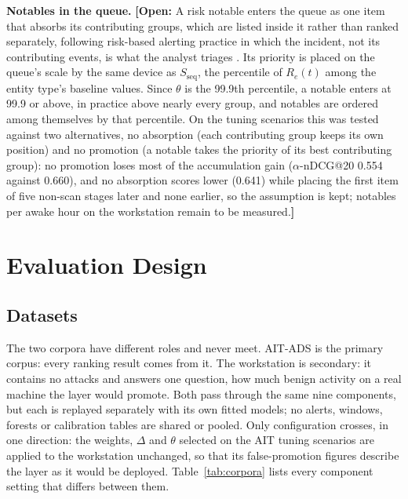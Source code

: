 \documentclass[conference]{IEEEtran}
\newcommand{\open}[1]{\textcolor{blue!70!black}{\textbf{[Open:} #1\textbf{]}}}
\begin{document}
\textbf{Notables in the queue.} \open{A risk notable enters the queue as one item that absorbs its contributing groups, which are listed inside it rather than ranked separately, following risk-based alerting practice in which the incident, not its contributing events, is what the analyst triages \cite{ref19}. Its priority is placed on the queue's scale by the same device as $S_\mathrm{seq}$, the percentile of $R_e(t)$ among the entity type's baseline values. Since $\theta$ is the 99.9th percentile, a notable enters at 99.9 or above, in practice above nearly every group, and notables are ordered among themselves by that percentile. On the tuning scenarios this was tested against two alternatives, no absorption (each contributing group keeps its own position) and no promotion (a notable takes the priority of its best contributing group): no promotion loses most of the accumulation gain ($\alpha$-nDCG@20 0.554 against 0.660), and no absorption scores lower (0.641) while placing the first item of five non-scan stages later and none earlier, so the assumption is kept; notables per awake hour on the workstation remain to be measured.}

\section{Evaluation Design}
\label{sec:eval}

\subsection{Datasets}

The two corpora have different roles and never meet. AIT-ADS is the primary corpus: every ranking result comes from it. The workstation is secondary: it contains no attacks and answers one question, how much benign activity on a real machine the layer would promote. Both pass through the same nine components, but each is replayed separately with its own fitted models; no alerts, windows, forests or calibration tables are shared or pooled. Only configuration crosses, in one direction: the weights, $\Delta$ and $\theta$ selected on the AIT tuning scenarios are applied to the workstation unchanged, so that its false-promotion figures describe the layer as it would be deployed. Table~\ref{tab:corpora} lists every component setting that differs between them.
\end{document}
